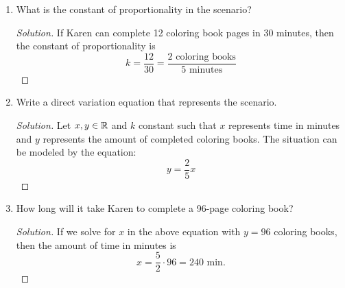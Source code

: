 \documentclass{article}
\begin{document}
\begin{enumerate}
\begin{proof}[Solution]
    Since \( y \) varies inversely with \( x \), we have 
    \[ y = \frac{k}{x} \tag{1}.\]
    where \( k \in \R \) is the constant of proportionality. First we need to find \( k \in \R \). Since \( y = 2 \) when \( x = 5 \), solving for \( k \) yields
    \[ k = y \cdot x = 2 \cdot 5 = 10.\]
    If \( y = 3 \), the value of \( x \) is simply 
    \[ x = \frac{10}{3}.\]
    \end{proof}
Karen can complete 12 coloring book pages in 30 minutes.
\item What is the constant of proportionality in the scenario?
    \begin{proof}[Solution]
    If Karen can complete 12 coloring book pages in 30 minutes, then the constant of proportionality is 
    \[ k = \frac{12}{30} = \frac{2 \text{ coloring books}}{5\text{ minutes}}\]
 
    \end{proof}
\item Write a direct variation equation that represents the scenario.
    \begin{proof}[Solution]
    Let \( x,y \in \mathbb{R} \) and \( k \) constant such that \(x \) represents time in minutes and \(y \) represents the amount of completed coloring books. The situation can be modeled by the equation:
    \[ y = \frac{2}{5}x\]
    \end{proof}
\item How long will it take Karen to complete a 96-page coloring book?
    \begin{proof}[Solution]
    If we solve for \( x \) in the above equation with \( y = 96\) coloring books, then the amount of time in minutes is 
    \[ x = \frac{5}{2} \cdot 96 = 240 \text{ min}.\]
    \end{proof}


\end{enumerate}
\end{document}
